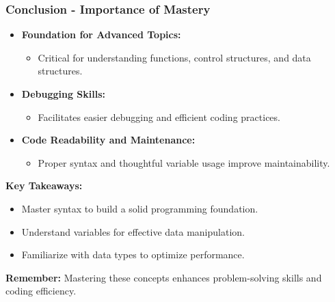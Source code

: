 \documentclass{beamer}
\begin{document}
\begin{frame}[fragile]
    \frametitle{Conclusion - Importance of Mastery}
    \begin{itemize}
        \item \textbf{Foundation for Advanced Topics:} 
        \begin{itemize}
            \item Critical for understanding functions, control structures, and data structures.
        \end{itemize}

        \item \textbf{Debugging Skills:} 
        \begin{itemize}
            \item Facilitates easier debugging and efficient coding practices.
        \end{itemize}

        \item \textbf{Code Readability and Maintenance:} 
        \begin{itemize}
            \item Proper syntax and thoughtful variable usage improve maintainability.
        \end{itemize}
    \end{itemize}

    \textbf{Key Takeaways:}
    \begin{itemize}
        \item Master syntax to build a solid programming foundation.
        \item Understand variables for effective data manipulation.
        \item Familiarize with data types to optimize performance.
    \end{itemize}
    
    \textbf{Remember:}
    Mastering these concepts enhances problem-solving skills and coding efficiency.
\end{frame}
\end{document}
